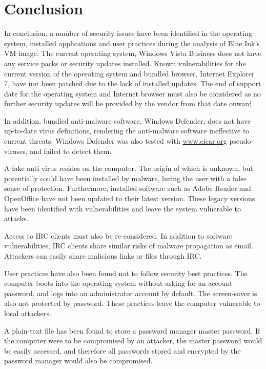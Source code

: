 \section{Conclusion}

In conclusion, a number of security issues have been identified in the operating system, installed applications and user practices during the analysis of Blue Ink's VM image. The current operating system, Windows Vista Business does not have any service packs or security updates installed. Known vulnerabilities for the current version of the operating system and bundled browser, Internet Explorer 7, have not been patched due to the lack of installed updates. The end of support date for the operating system and Internet browser must also be considered as no further security updates will be provided by the vendor from that date onward.

In addition, bundled anti-malware software, Windows Defender, does not have up-to-date virus definitions, rendering the anti-malware software ineffective to current threats. Windows Defender was also tested with \href{http://www.eicar.org/85-0-Download.html}{www.eicar.org} pseudo-viruses, and failed to detect them.

A fake anti-virus resides on the computer. The origin of which is unknown, but potentially could have been installed by malware, luring the user with a false sense of protection. Furthermore, installed software such as Adobe Reader and OpenOffice have not been updated to their latest version. These legacy versions have been identified with vulnerabilities and leave the system vulnerable to attacks.

Access to IRC clients must also be re-considered. In addition to software vulnerabilities, IRC clients share similar risks of malware propagation as email. Attackers can easily share malicious links or files through IRC.

User practices have also been found not to follow security best practices. The computer boots into the operating system without asking for an account password, and logs into an administrator account by default. The screen-saver is also not protected by password. These practices leave the computer vulnerable to local attackers.

A plain-text file has been found to store a password manager master password. If the computer were to be compromised by an attacker, the master password would be easily accessed, and therefore all passwords stored and encrypted by the password manager would also be compromised.

